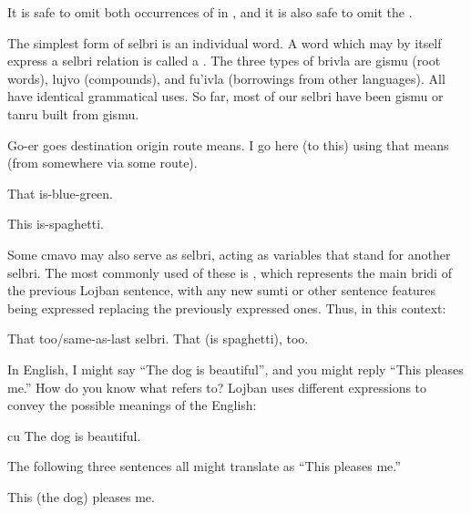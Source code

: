 It is safe to omit both occurrences of  in , and it is also safe to omit the .



The simplest form of selbri is an individual word. A word which may by itself express a selbri relation is called a . The three types of brivla are gismu (root words), lujvo (compounds), and fu'ivla (borrowings from other languages). All have identical grammatical uses. So far, most of our selbri have been gismu or tanru built from gismu.
\begin{example}[gismu]
      \n
Go-er goes destination origin route means.\n
I go here (to this) using that means (from somewhere via some route).
\end{example}

\begin{example}[lujvo]
  \n
That    is-blue-green.
\end{example}

\begin{example}[fu'ivla]
  \n
This     is-spaghetti.
\end{example}

Some cmavo may also serve as selbri, acting as variables that stand for another selbri. The most commonly used of these is , which represents the main bridi of the previous Lojban sentence, with any new sumti or other sentence features being expressed replacing the previously expressed ones. Thus, in this context:
\begin{example}
   \n
That     too/same-as-last selbri.\n
That (is spaghetti), too.
\end{example}



In English, I might say ``The dog is beautiful'', and you might reply ``This pleases me.'' How do you know what  refers to? Lojban uses different expressions to convey the possible meanings of the English:
\begin{example}
 cu \n
The dog is beautiful.
\end{example}

The following three sentences all might translate as ``This pleases me.''
\begin{example}
   \n
This (the dog) pleases me.
\end{example}

